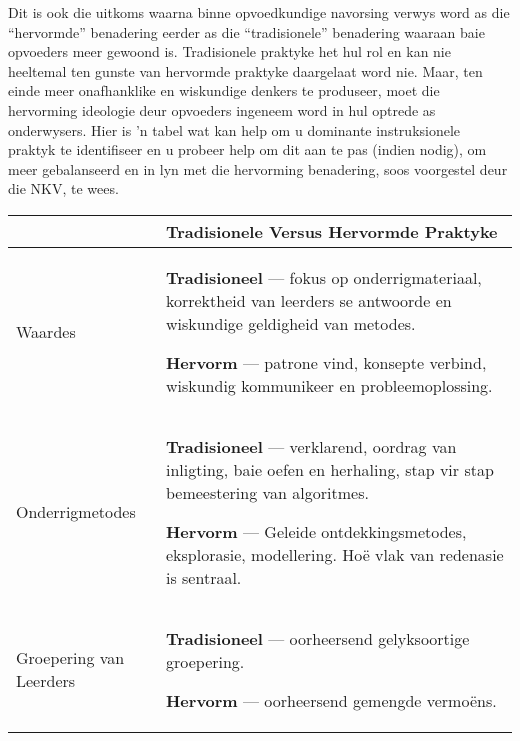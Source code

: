 Dit is ook die uitkoms waarna binne opvoedkundige navorsing verwys
word as die ``hervormde'' benadering eerder as die
``tradisionele'' benadering waaraan baie opvoeders meer gewoond is.
Tradisionele praktyke het hul rol en kan nie heeltemal ten gunste van
hervormde praktyke daargelaat word nie.
Maar, ten einde meer onafhanklike en wiskundige denkers te produseer,
moet die hervorming ideologie deur opvoeders ingeneem word in hul
optrede as onderwysers.
Hier is 'n tabel wat kan help om u dominante instruksionele praktyk te
identifiseer en u probeer help om dit aan te pas (indien nodig), om
meer gebalanseerd en in lyn met die hervorming benadering, soos
voorgestel deur die NKV, te wees.

\begin{table}[H]
  \begin{center}
    \begin{tabular}{|p{3.5cm}|p{8.5cm}|} \hline 
&
\textbf{Tradisionele Versus Hervormde Praktyke} \\ \hline
Waardes &
\textbf{Tradisioneel} --- fokus op onderrigmateriaal, korrektheid van leerders se antwoorde en wiskundige geldigheid van metodes.\par
\textbf{Hervorm} --- patrone vind, konsepte verbind, wiskundig kommunikeer en probleemoplossing. \\ \hline
Onderrigmetodes &
\textbf{Tradisioneel} --- verklarend, oordrag van inligting, baie oefen en herhaling, stap vir stap bemeestering van algoritmes.\par
\textbf{Hervorm} --- Geleide ontdekkingsmetodes, eksplorasie, modellering. Ho\"{e} vlak van redenasie is sentraal. \\ \hline
Groepering van Leerders &
\textbf{Tradisioneel} --- oorheersend gelyksoortige groepering. \par
\textbf{Hervorm} --- oorheersend gemengde vermo\"{e}ns. \\ \hline
    \end{tabular}
  \end{center}
\end{table}

